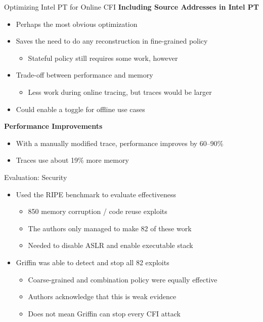 \documentclass[12pt, dvipsnames, aspectratio=169]{beamer}
\begin{document}
\begin{frame}[c]{Optimizing Intel PT for Online CFI}{}
  {\bf Including Source Addresses in Intel PT}
  \begin{itemize}
    \item Perhaps the most obvious optimization
    \item Saves the need to do any reconstruction in fine-grained policy
    \begin{itemize}
      \item Stateful policy still requires some work, however
    \end{itemize}
    \item Trade-off between performance and memory
    \begin{itemize}
      \item Less work during online tracing, but traces would be larger
    \end{itemize}
    \item Could enable a toggle for offline use cases
  \end{itemize}

  \vfill
  {\bf Performance Improvements}
  \begin{itemize}
    \item With a manually modified trace, performance improves by 60--90\%
    \item Traces use about 19\% more memory
  \end{itemize}
\end{frame}

\begin{frame}[c]{Evaluation: Security}{}
  \begin{itemize}
    \item Used the RIPE benchmark to evaluate effectiveness
    \begin{itemize}
      \item 850 memory corruption / code reuse exploits
      \item The authors only managed to make 82 of these work
      \item Needed to disable ASLR and enable executable stack
    \end{itemize}
    \vfill
    \item Griffin was able to detect and stop all 82 exploits
    \begin{itemize}
      \item Coarse-grained and combination policy were equally effective
      \item Authors acknowledge that this is weak evidence
      \item Does not mean Griffin can stop every CFI attack
    \end{itemize}
  \end{itemize}
\end{frame}
\end{document}
